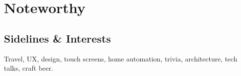 \documentclass[]{cvpn}
\begin{document}
\begin{multicols}{2}
\begin{skillslist}
\end{skillslist}

\section{Noteworthy}




\subsection{Sidelines \& Interests}
Travel, UX, design, touch screens, home automation,
trivia, architecture, tech talks, craft beer.

\end{multicols}
\end{document}
